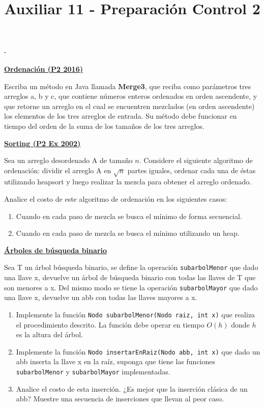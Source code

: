 -\documentclass[dcc,uchile,sol]{fcfmcourse}
\title{Auxiliar 11 - Preparación Control 2}
\newcommand{\ptitle}[1]{\underline{\textbf{#1}}}
\begin{document}
\maketitle

\vspace{-1ex}


\begin{problems}
\problem \ptitle{Ordenación (P2 2016)}

Escriba un método en Java llamada \textbf{Merge3}, que reciba como parámetros tres arreglos a, b y c, que contiene números enteros ordenados en orden ascendente, y que retorne un arreglo en el cual se encuentren mezclados (en orden ascendente) los elementos de los tres arreglos de entrada. Su método debe funcionar en tiempo del orden de la suma de los tamaños de los tres arreglos.

\problem \ptitle{Sorting (P2 Ex 2002)}

Sea un arreglo desordenado A de tamaño $n$. Considere el siguiente algoritmo de ordenación: dividir el arreglo A en
$\sqrt{n}$ partes iguales, ordenar cada una de éstas utilizando heapsort y luego realizar la mezcla para obtener el arreglo ordenado.

Analice el costo de este algoritmo de ordenación en los siguientes casos:
\begin{enumerate}
    \item Cuando en cada paso de mezcla se busca el mínimo de forma secuencial.
    \item Cuando en cada paso de mezcla se busca el mínimo utilizando un heap.
\end{enumerate}

\problem \ptitle{Árboles de búsqueda binario}

Sea T un árbol búsqueda binario, se define la operación \texttt{subarbolMenor} que dado una llave x, devuelve un árbol de búsqueda binario con todas las llaves de T que son menores a x. Del mismo modo se tiene la operación \texttt{subarbolMayor} que dado una llave x, devuelve un abb con todas las llaves mayores a x.

\begin{enumerate}
    \item Implemente la función \texttt{Nodo subarbolMenor(Nodo raiz, int x)} que realiza el procedimiento descrito. La función debe operar en tiempo $O(h)$ donde $h$ es la altura del árbol.
    \item Implemente la función \texttt{Nodo insertarEnRaiz(Nodo abb, int x)} que dado un abb inserta la llave x en la raíz, suponga que tiene las funciones \texttt{subarbolMenor} y \texttt{subarbolMayor} implementadas.
    \item Analice el costo de esta inserción. ¿Es mejor que la inserción clásica de un abb? Muestre una secuencia de inserciones que llevan al peor caso. 
    
\end{enumerate}


\end{problems}
\end{document}
